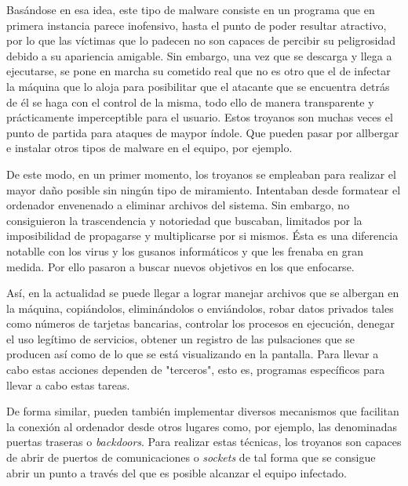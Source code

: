 \documentclass[12pt]{article}
\newcommand{\newpar} {
    \vskip 1cm
}
\begin{document}
            \newpar

            Basándose en esa idea, este tipo de malware consiste en un programa que en primera instancia parece inofensivo, hasta el punto de poder resultar atractivo, por lo que las víctimas que lo padecen no son capaces de percibir su peligrosidad debido a su apariencia amigable. Sin embargo, una vez que se descarga y llega a ejecutarse, se pone en marcha su cometido real que no es otro que el de infectar la máquina que lo aloja para posibilitar que el atacante que se encuentra detrás de él se haga con el control de la misma, todo ello de manera transparente y prácticamente imperceptible para el usuario. Estos troyanos son muchas veces el punto de partida para ataques de maypor índole. Que pueden pasar por allbergar e instalar otros tipos de malware en el equipo, por ejemplo.

            \newpar

            De este modo, en un primer momento, los troyanos se empleaban para realizar el mayor daño posible sin ningún tipo de miramiento. Intentaban desde formatear el ordenador envenenado a eliminar archivos del sistema. Sin embargo, no consiguieron la trascendencia y notoriedad que buscaban, limitados por la imposibilidad de propagarse y multiplicarse por si mismos. Ésta es una diferencia notablle con los virus y los gusanos informáticos y que les frenaba en gran medida. Por ello pasaron a buscar nuevos objetivos en los que enfocarse.

            \newpar

            Así, en la actualidad se puede llegar a lograr manejar archivos que se albergan en la máquina, copiándolos, eliminándolos o enviándolos, robar datos privados tales como números de tarjetas bancarias, controlar los procesos en ejecución, denegar el uso legítimo de servicios, obtener un registro de las pulsaciones que se producen así como de lo que se está visualizando en la pantalla. Para llevar a cabo estas acciones dependen de "terceros", esto es, programas específicos para llevar a cabo estas tareas.

            \newpar

            De forma similar, pueden también implementar diversos mecanismos que facilitan la conexión al ordenador desde otros lugares como, por ejemplo, las denominadas puertas traseras o \textit{backdoors}. Para realizar estas técnicas, los troyanos son capaces de abrir de puertos de comunicaciones o \textit{sockets} de tal forma que se consigue abrir un punto a través del que es posible alcanzar el equipo infectado.
\end{document}
